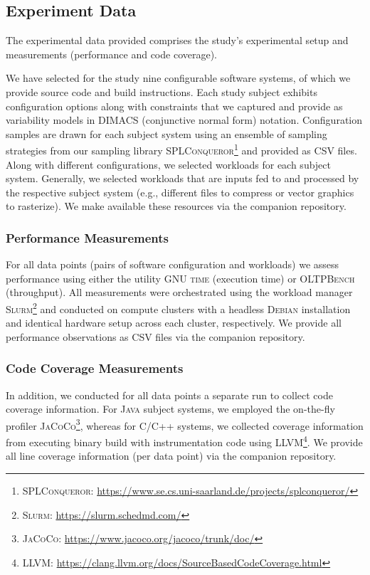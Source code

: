 \documentclass[10pt,conference]{IEEEtran}
\begin{document}
	\subsection{Experiment Data}
	The experimental data provided comprises the study's experimental setup and measurements (performance and code coverage).
	
	We have selected for the study nine configurable software systems, of which we provide source code and build instructions. Each study subject exhibits configuration options along with constraints that we captured and provide as variability models in DIMACS (conjunctive normal form) notation. Configuration samples are drawn for each subject system using an ensemble of sampling strategies from our sampling library \textsc{SPLConqueror}\footnote{\textsc{SPLConqueror}: \url{https://www.se.cs.uni-saarland.de/projects/splconqueror/}} and provided as CSV files.
	Along with different configurations, we selected workloads for each subject system. Generally, we selected workloads that are inputs fed to and processed by the respective subject system (e.g., different files to compress or vector graphics to rasterize). We make available these resources via the companion repository.
	
	\subsubsection{Performance Measurements}
	For all data points (pairs of software configuration and workloads) we assess performance using either the utility \textsc{GNU time} (execution time) or \textsc{OLTPBench}~\cite{difallah_oltp_2013} (throughput). All measurements were orchestrated using the workload manager \textsc{Slurm}\footnote{\textsc{Slurm}: \url{https://slurm.schedmd.com/}} and conducted on compute clusters with a headless \textsc{Debian} installation and identical hardware setup across each cluster, respectively. We provide all performance observations as CSV files via the companion repository.
	
	\subsubsection{Code Coverage Measurements}
	In addition, we conducted for all data points a separate run to collect code coverage information. For \textsc{Java} subject systems, we employed the on-the-fly profiler \textsc{JaCoCo}\footnote{\textsc{JaCoCo}: \url{https://www.jacoco.org/jacoco/trunk/doc/}}, whereas for \textsc{C/C++} systems, we collected coverage information from executing binary build with instrumentation code using LLVM\footnote{\textsc{LLVM}: \url{https://clang.llvm.org/docs/SourceBasedCodeCoverage.html}}. We provide all line coverage information (per data point) via the companion repository.
		
\end{document}
